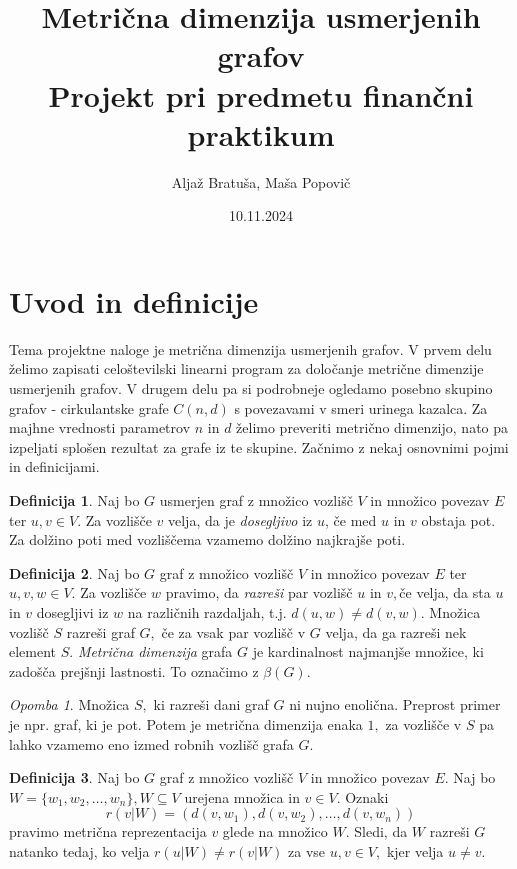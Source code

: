 \documentclass[a4paper,12pt]{article}
\title{%
  Metrična dimenzija usmerjenih grafov \\
  \large Projekt pri predmetu finančni praktikum\\}
\author{Aljaž Bratuša, Maša Popovič}
\date{10.11.2024}
\theoremstyle{definition}
\newtheorem{definicija}{Definicija}[section]
\theoremstyle{remark}
\newtheorem*{opomba}{Opomba}
\theoremstyle{definition}
\begin{document}
\maketitle

\section{Uvod in definicije}

Tema projektne naloge je metrična dimenzija usmerjenih grafov. V prvem delu želimo zapisati 
celoštevilski linearni program za določanje metrične dimenzije usmerjenih grafov. V drugem delu 
pa si podrobneje ogledamo posebno skupino grafov - cirkulantske grafe $C(n, d)$ s povezavami v smeri
urinega kazalca. Za majhne vrednosti parametrov $n$ in  $d$ želimo preveriti metrično dimenzijo, nato 
pa izpeljati splošen rezultat za grafe iz te skupine. Začnimo z nekaj osnovnimi pojmi
in definicijami. 

\begin{definicija}
    Naj bo $G$ usmerjen graf z množico vozlišč $V$ in 
    množico povezav $E$ ter $u,v \in V.$ Za vozlišče $v$ velja, da je \textit{dosegljivo}
    iz $u$, če med $u$ in $v$ obstaja pot. Za dolžino poti med vozliščema vzamemo dolžino
    najkrajše poti.
\end{definicija}

\begin{definicija}
    Naj bo $G$ graf z množico vozlišč $V$ in množico povezav $E$ ter $u,v,w \in V.$ Za vozlišče 
    $w$ pravimo, da \textit{razreši} par vozlišč $u$ in $v,$če velja, da sta $u$ in $v$ dosegljivi
    iz $w$ na različnih razdaljah, t.j. $d(u,w) \neq d(v,w).$ Množica vozlišč $S$ razreši graf $G,$ če 
    za vsak par vozlišč v $G$ velja, da ga razreši nek element $S.$ \textit{Metrična dimenzija} grafa $G$
    je kardinalnost najmanjše množice, ki zadošča prejšnji lastnosti. To označimo z $\beta(G).$
\end{definicija}

\begin{opomba}
    Množica $S,$ ki razreši dani graf $G$ ni nujno enolična. Preprost primer je npr. graf, ki je pot. Potem je 
    metrična dimenzija enaka $1,$ za vozlišče v $S$ pa lahko vzamemo eno izmed robnih vozlišč grafa $G.$
\end{opomba}

\begin{definicija}
    Naj bo $G$ graf z množico vozlišč $V$ in množico povezav $E.$
    Naj bo $W = \{w_1, w_2, \dots ,w_n \},  W \subseteq V$ urejena množica in $v \in V.$
    Oznaki $$r(v|W) = (d(v, w_1), d(v, w_2), \dots ,d(v, w_n))$$ pravimo metrična 
    reprezentacija $v$ glede na množico $W.$ Sledi, da $W$ razreši $G$ natanko tedaj, ko velja 
    $r(u|W) \neq r(v|W)$ za vse $u,v \in V,$ kjer velja $u \neq v.$
\end{definicija}
\end{document}

